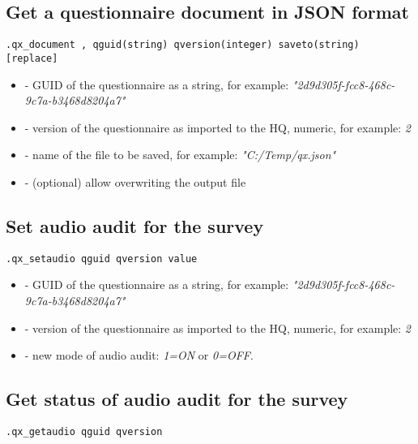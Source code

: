 \subsection{Get a questionnaire document in JSON format}

\begin{lstlisting}[style=CommandLineStyle]
.qx_document , qguid(string) qversion(integer) saveto(string) [replace]
\end{lstlisting}

\optsheader
\begin{itemize}
    \item {} - GUID of the questionnaire as a string, for example:
          \newline \textit{"2d9d305f-fcc8-468c-9c7a-b3468d8204a7"}
    \item {} - version of the questionnaire as imported
          to the HQ, numeric, for example: \textit{2}
    \item {} - name of the file to be saved, for example:
          \textit{"C:/Temp/qx.json"}
    \item {} - (optional) allow overwriting the output file
\end{itemize}

\subsection{Set audio audit for the survey}
\begin{lstlisting}[style=CommandLineStyle]
.qx_setaudio qguid qversion value
\end{lstlisting}

\paramsheader
\begin{itemize}
    \item {} - GUID of the questionnaire as a string, for example:
          \newline
          \textit{"2d9d305f-fcc8-468c-9c7a-b3468d8204a7"}
    \item {} - version of the questionnaire as imported
          to the HQ, numeric, for example: \textit{2}
    \item {} - new mode of audio audit: \textit{1=ON} or
          \textit{0=OFF}.
\end{itemize}

\subsection{Get status of audio audit for the survey}
\begin{lstlisting}[style=CommandLineStyle]
.qx_getaudio qguid qversion
\end{lstlisting}

